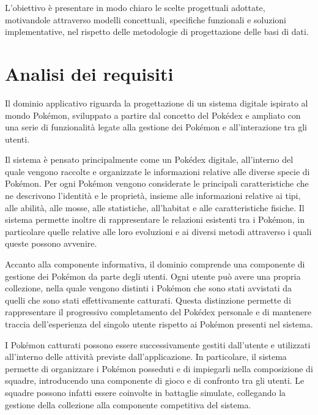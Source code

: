 \documentclass[a4paper,12pt]{report}
\begin{document}
L'obiettivo è presentare in modo chiaro le scelte progettuali adottate,
motivandole attraverso modelli concettuali, specifiche funzionali e soluzioni
implementative, nel rispetto delle metodologie di progettazione delle basi di
dati.

\section{Analisi dei requisiti}
Il dominio applicativo riguarda la progettazione di un sistema digitale ispirato al mondo Pokémon, sviluppato a partire dal concetto del Pokédex e ampliato con una serie di funzionalità legate alla gestione dei Pokémon e all'interazione tra gli utenti.

\vspace{0,5 cm}
Il sistema è pensato principalmente come un Pokédex digitale, all'interno del quale vengono raccolte e organizzate le informazioni relative alle diverse specie di Pokémon. Per ogni Pokémon vengono considerate le principali caratteristiche che ne descrivono l'identità e le proprietà, insieme alle informazioni relative ai tipi, alle abilità, alle mosse, alle statistiche, all'habitat e alle caratteristiche fisiche. Il sistema permette inoltre di rappresentare le relazioni esistenti tra i Pokémon, in particolare quelle relative alle loro evoluzioni e ai diversi metodi attraverso i quali queste possono avvenire.

\vspace{0,5 cm}
Accanto alla componente informativa, il dominio comprende una componente di gestione dei Pokémon da parte degli utenti. Ogni utente può avere una propria collezione, nella quale vengono distinti i Pokémon che sono stati avvistati da quelli che sono stati effettivamente catturati. Questa distinzione permette di rappresentare il progressivo completamento del Pokédex personale e di mantenere traccia dell'esperienza del singolo utente rispetto ai Pokémon presenti nel sistema.

\vspace{0,5 cm}
I Pokémon catturati possono essere successivamente gestiti dall'utente e utilizzati all'interno delle attività previste dall'applicazione. In particolare, il sistema permette di organizzare i Pokémon posseduti e di impiegarli nella composizione di squadre, introducendo una componente di gioco e di confronto tra gli utenti. Le squadre possono infatti essere coinvolte in battaglie simulate, collegando la gestione della collezione alla componente competitiva del sistema.
\end{document}
